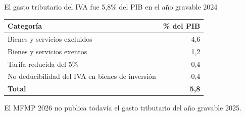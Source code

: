 \begin{frame}{El gasto tributario del IVA fue 5,8\% del PIB en el año gravable 2024}
\centering
\small
\begin{tabular}{lr}
\toprule
\textbf{Categoría} & \textbf{\% del PIB} \\
\midrule
Bienes y servicios excluidos          &  4,6 \\
Bienes y servicios exentos            &  1,2 \\
Tarifa reducida del 5\%               &  0,4 \\
No deducibilidad del IVA en bienes de inversión & -0,4 \\
\midrule
\textbf{Total}                        & \textbf{5,8} \\
\bottomrule
\end{tabular}
\vspace{0.2cm}
\scriptsize El MFMP 2026 no publica todavía el gasto tributario del año gravable 2025.
\end{frame}